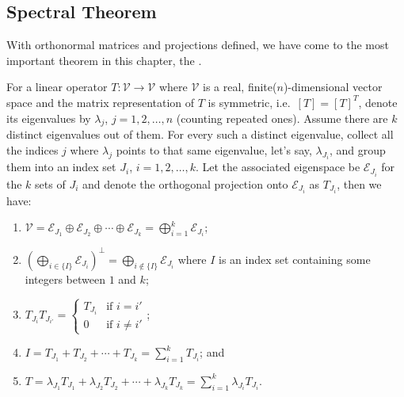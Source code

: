 \subsection{Spectral Theorem}
With orthonormal matrices and projections defined, we have come to the most important theorem in this chapter, the .
\begin{thm}
\label{thm:spectral}
For a linear operator $T: \mathcal{V} \to \mathcal{V}$ where $\mathcal{V}$ is a real, finite($n$)-dimensional vector space and the matrix representation of $T$ is symmetric, i.e.\ $[T]=[T]^T$, denote its eigenvalues by $\lambda_j$, $j = 1,2,\ldots,n$ (counting repeated ones). Assume there are $k$ distinct eigenvalues out of them. For every such a distinct eigenvalue, collect all the indices $j$ where $\lambda_j$ points to that same eigenvalue, let's say, $\lambda_{J_i}$, and group them into an index set $J_i$, $i = 1,2,\ldots,k$. Let the associated eigenspace be $\mathcal{E}_{J_i}$ for the $k$ sets of $J_i$ and denote the orthogonal projection onto $\mathcal{E}_{J_i}$ as $T_{J_i}$, then we have:
\begin{enumerate}[label=(\alph*)]
\item $\mathcal{V} = \mathcal{E}_{J_1} \oplus \mathcal{E}_{J_2} \oplus \cdots \oplus \mathcal{E}_{J_k} = \bigoplus_{i=1}^{k} \mathcal{E}_{J_i}$;
\item $(\bigoplus_{i \in \{I\}} \mathcal{E}_{J_i})^\perp = \bigoplus_{i \notin \{I\}} \mathcal{E}_{J_i}$ where $I$ is an index set containing some integers between $1$ and $k$;
\item $T_{J_i} T_{J_{i'}} = 
\begin{cases}
T_{J_i} & \text{if $i = i'$} \\
0 & \text{if $i \neq i'$}
\end{cases}$;
\item $I = T_{J_1} + T_{J_2} + \cdots + T_{J_k} = \sum_{i=1}^{k} T_{J_i}$; and
\item $T = \lambda_{J_1}T_{J_1} + \lambda_{J_2}T_{J_2} + \cdots + \lambda_{J_k}T_{J_k} = \sum_{i=1}^{k} \lambda_{J_i}T_{J_i}$.
\end{enumerate}
\end{thm}
